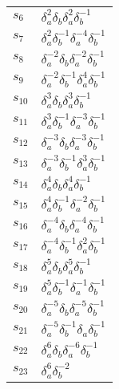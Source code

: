 \documentclass{article}
\begin{document}
\begin{center}
\begin{tabular}{ll}
$s_{6}$ & $\delta_a^{2}\delta_b^{}\delta_a^{2}\delta_b^{-1}$ \\
$s_{7}$ & $\delta_a^{2}\delta_b^{-1}\delta_a^{-4}\delta_b^{-1}$ \\
$s_{8}$ & $\delta_a^{-2}\delta_b^{}\delta_a^{-2}\delta_b^{-1}$ \\
$s_{9}$ & $\delta_a^{-2}\delta_b^{-1}\delta_a^{4}\delta_b^{-1}$ \\
$s_{10}$ & $\delta_a^{3}\delta_b^{}\delta_a^{3}\delta_b^{-1}$ \\
$s_{11}$ & $\delta_a^{3}\delta_b^{-1}\delta_a^{-3}\delta_b^{-1}$ \\
$s_{12}$ & $\delta_a^{-3}\delta_b^{}\delta_a^{-3}\delta_b^{-1}$ \\
$s_{13}$ & $\delta_a^{-3}\delta_b^{-1}\delta_a^{3}\delta_b^{-1}$ \\
$s_{14}$ & $\delta_a^{4}\delta_b^{}\delta_a^{4}\delta_b^{-1}$ \\
$s_{15}$ & $\delta_a^{4}\delta_b^{-1}\delta_a^{-2}\delta_b^{-1}$ \\
$s_{16}$ & $\delta_a^{-4}\delta_b^{}\delta_a^{-4}\delta_b^{-1}$ \\
$s_{17}$ & $\delta_a^{-4}\delta_b^{-1}\delta_a^{2}\delta_b^{-1}$ \\
$s_{18}$ & $\delta_a^{5}\delta_b^{}\delta_a^{5}\delta_b^{-1}$ \\
$s_{19}$ & $\delta_a^{5}\delta_b^{-1}\delta_a^{-1}\delta_b^{-1}$ \\
$s_{20}$ & $\delta_a^{-5}\delta_b^{}\delta_a^{-5}\delta_b^{-1}$ \\
$s_{21}$ & $\delta_a^{-5}\delta_b^{-1}\delta_a^{}\delta_b^{-1}$ \\
$s_{22}$ & $\delta_a^{6}\delta_b^{}\delta_a^{-6}\delta_b^{-1}$ \\
$s_{23}$ & $\delta_a^{6}\delta_b^{-2}$ \\
\bottomrule
\end{tabular}
\end{center}

\thispagestyle{empty}
\end{document}
